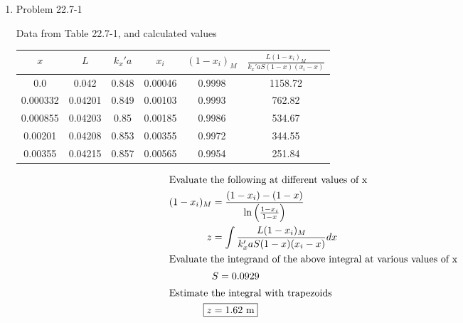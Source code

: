 \documentclass[12pt]{article}
\begin{document}
\begin{enumerate}
\newpage
    \item Problem 22.7-1
    
    Data from Table 22.7-1, and calculated values

    \begin{tabular}{|c|c|c|c|c|c|}
        \hline
        $x$ & $L$ & $k_x'a$ & $x_i$ & $(1 - x_i)_M$ & $\frac{L (1 - x_i)_M}{k_x'a S (1 - x) (x_i - x)}$ \\
        \hline
        0.0 & 0.042 & 0.848 & 0.00046 & 0.9998 & 1158.72 \\
        0.000332 & 0.04201 & 0.849 & 0.00103 & 0.9993 & 762.82 \\
        0.000855 & 0.04203 & 0.85 & 0.00185 & 0.9986 & 534.67 \\
        0.00201 & 0.04208 & 0.853 & 0.00355 & 0.9972 & 344.55 \\
        0.00355 & 0.04215 & 0.857 & 0.00565 & 0.9954 & 251.84 \\
        \hline
    \end{tabular}

    \begin{align*}
        \intertext{Evaluate the following at different values of x}
        (1 - x_i)_M &= \frac{(1 - x_i) - (1 - x)}{\ln\left(\frac{1 - x_i}{1 - x}\right)} \\
        z &= \int \frac{L (1 - x_i)_M}{k_x'a S (1 - x) (x_i - x)} dx \\
        \intertext{Evaluate the integrand of the above integral at various values of x}
        & S = 0.0929 \\
        \intertext{Estimate the integral with trapezoids}
        \Aboxed{z &= 1.62 \text{ m}}
    \end{align*}

\end{enumerate}
\end{document}
